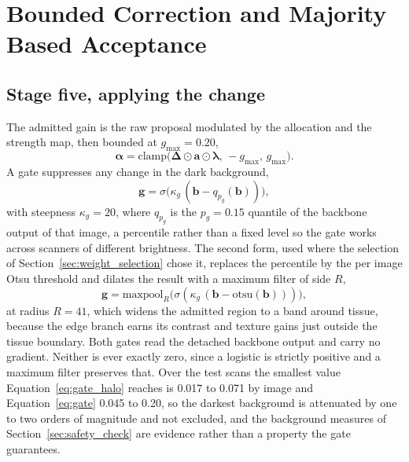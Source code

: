 \section{Bounded Correction and Majority Based Acceptance}
\label{sec:bounded_safety}

\subsection{Stage five, applying the change}
\label{sec:composition}
The admitted gain is the raw proposal modulated by the allocation and the strength map, then bounded
at $g_{\max} = 0.20$,
\begin{equation}
\boldsymbol{\alpha} = \mathrm{clamp}\big(\boldsymbol{\Delta} \odot \mathbf{a} \odot \boldsymbol{\lambda},\, -g_{\max},\, g_{\max}\big).
\label{eq:alpha}
\end{equation}
A gate suppresses any change in the dark background,
\begin{equation}
\mathbf{g} = \sigma\big(\kappa_g\,(\mathbf{b} - q_{p_g}(\mathbf{b}))\big),
\label{eq:gate}
\end{equation}
with steepness $\kappa_g = 20$, where $q_{p_g}$ is the $p_g = 0.15$ quantile of the backbone output
of that image, a percentile rather than a fixed level so the gate works across scanners of different
brightness. The second form, used where the
selection of Section~\ref{sec:weight_selection} chose it, replaces the percentile by the per image
Otsu threshold and dilates the result with a maximum filter of side $R$,
\begin{equation}
\mathbf{g} = \mathrm{maxpool}_{R}\big(\sigma(\kappa_g\,(\mathbf{b} - \mathrm{otsu}(\mathbf{b})))\big) ,
\label{eq:gate_halo}
\end{equation}
at radius $R = 41$, which widens the admitted region to a band around tissue, because the edge branch
earns its contrast and texture gains just outside the tissue boundary. Both gates read the detached backbone output and
carry no gradient. Neither is ever exactly zero, since a logistic is strictly positive and a maximum
filter preserves that. Over the test scans the smallest value Equation~\eqref{eq:gate_halo} reaches
is 0.017 to 0.071 by image and Equation~\eqref{eq:gate} 0.045 to 0.20, so the darkest background is
attenuated by one to two orders of magnitude and not excluded, and the background measures of
Section~\ref{sec:safety_check} are evidence rather than a property the gate guarantees.

